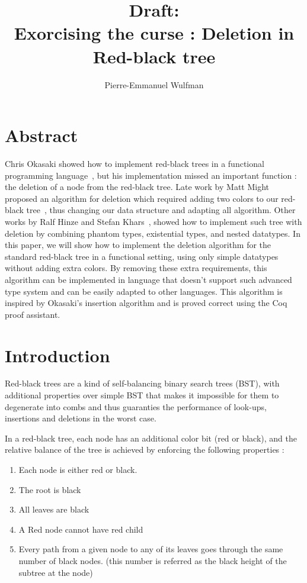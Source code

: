 \documentclass[10pt,a4paper]{article}
\title{Draft:\\ Exorcising the curse : Deletion in Red-black tree}
\author{Pierre-Emmanuel Wulfman}
\begin{document}
\maketitle

\section*{Abstract}

Chris Okasaki showed how to implement red-black trees in a functional programming language~\cite{okasaki_1999}, but his implementation missed an important function : the deletion of a node from the red-black tree.
Late work by Matt Might proposed an algorithm for deletion which required adding two colors to our red-black tree~\cite{germane_might_2014}, thus changing our data structure and adapting all algorithm.
Other works by Ralf Hinze and Stefan Khars~\cite{kahrs_2001}, showed how to implement such tree with deletion by combining phantom types, existential types, and nested datatypes.
In this paper, we will show how to implement the deletion algorithm for the standard red-black tree in a functional setting, using only simple datatypes without adding extra colors.
By removing these extra requirements, this algorithm can be implemented in language that doesn't support such advanced type system and can be easily adapted to other languages.
This algorithm is inspired by Okasaki's insertion algorithm and is proved correct using the Coq proof assistant.

\section{Introduction}

Red-black trees are a kind of self-balancing binary search trees (BST),
with additional properties over simple BST that makes it impossible for them to degenerate into combs
and thus guaranties the performance of look-ups, insertions and deletions in the worst case.


In a red-black tree, each node has an additional color bit (red or black), and the relative balance
of the tree is achieved by enforcing the following properties :
\begin{enumerate}
\item Each node is either red or black.
\item The root is black
\item All leaves are black
\item A Red node cannot have red child
\item Every path from a given node to any of its leaves goes through the same number of black nodes. (this number is referred as the black height of the subtree at the node)
\end{enumerate}
\end{document}
